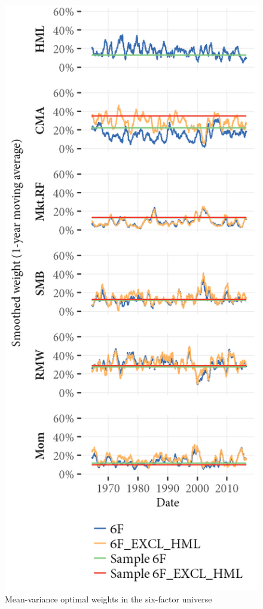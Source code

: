 \begin{figure}[htbp]
  \caption{Mean-variance optimal weights in the six-factor universe}
  \label{fig:mv_optimal_6}
  \centering
  \begin{minipage}{\textwidth}
  \includegraphics[scale = 1]{graphics/Weights_6F_EXCL_HML_6F.png}

\end{minipage}
\end{figure}
